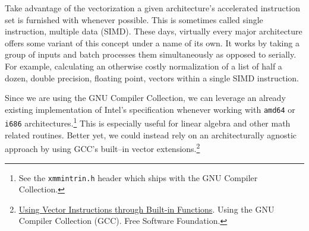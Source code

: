 Take advantage of the vectorization a given architecture's accelerated instruction set is furnished with whenever possible. This is sometimes called single instruction, multiple data (SIMD). These days, virtually every major architecture offers some variant of this concept under a name of its own. It works by taking a group of inputs and batch processes them simultaneously as opposed to serially. For example, calculating an otherwise costly normalization of a list of half a dozen, double precision, floating point, vectors within a single SIMD instruction.

Since we are using the GNU Compiler Collection, we can leverage an already existing implementation of Intel's specification whenever working with {\tt amd64} or {\tt i686} architectures.\footnote{See the {\tt xmmintrin.h} header which ships with the GNU Compiler Collection.} This is especially useful for linear algebra and other math related routines. Better yet, we could instead rely on an architecturally agnostic approach by using GCC's built--in vector extensions.\footnote
{\href{http://gcc.gnu.org/onlinedocs/gcc/Vector-Extensions.html}{Using Vector Instructions through Built-in Functions}. Using the GNU Compiler Collection (GCC). Free Software Foundation.}


